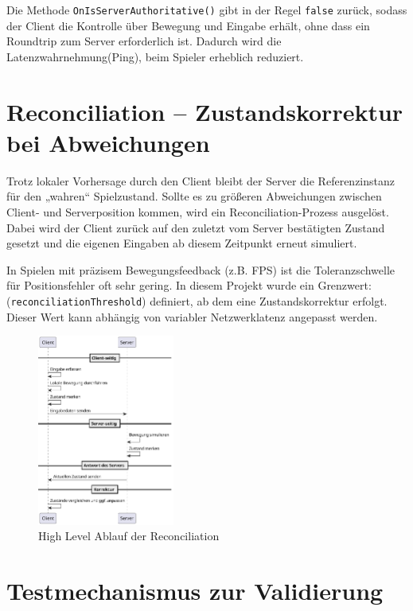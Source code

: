 Die Methode \texttt{OnIsServerAuthoritative()} gibt in der Regel \texttt{false} zurück, sodass der Client die Kontrolle über Bewegung und Eingabe erhält, ohne dass ein Roundtrip zum Server erforderlich ist. Dadurch wird die Latenzwahrnehmung(Ping), beim Spieler erheblich reduziert.

\newpage
\section{Reconciliation – Zustandskorrektur  bei Abweichungen}

Trotz lokaler Vorhersage durch den Client bleibt der Server die Referenzinstanz für den „wahren“ Spielzustand. Sollte es zu größeren Abweichungen zwischen Client- und Serverposition kommen, wird ein Reconciliation-Prozess ausgelöst. Dabei wird der Client zurück auf den zuletzt vom Server bestätigten Zustand gesetzt und die eigenen Eingaben ab diesem Zeitpunkt erneut simuliert.

In Spielen mit präzisem Bewegungsfeedback (z.B. FPS) ist die Toleranzschwelle für Positionsfehler oft sehr gering. In diesem Projekt wurde ein Grenzwert: \\ (\texttt{reconciliationThreshold}) definiert, ab dem eine Zustandskorrektur erfolgt. Dieser Wert kann abhängig von variabler Netzwerklatenz angepasst werden.
\begin{figure}[h] 
  \centering
  \includegraphics[width=0.4\textwidth, keepaspectratio]{out/diagrams/Reconciliation-high/Reconciliation-high.pdf} %
  \caption{High Level Ablauf der Reconciliation }
  \label{fig:rec}
\end{figure}

\newpage
\section{Testmechanismus zur Validierung}
\label{Reconciliation-Test}

